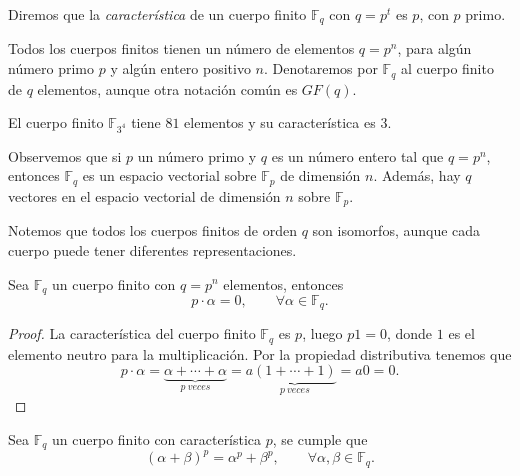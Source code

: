 Diremos que la \emph{característica} de un cuerpo finito $\mathbb{F}_q$ con $q = p^t$ es $p$, con $p$ primo.

Todos los cuerpos finitos tienen un número de elementos $q = p^n$, para algún número primo $p$ y algún entero positivo $n$. Denotaremos por $\mathbb{F}_q$ al cuerpo finito de $q$ elementos, aunque otra notación común es $GF(q)$.

\begin{exampleth}
    El cuerpo finito $\mathbb{F}_{3^4}$ tiene $81$ elementos y su característica es $3$.
\end{exampleth}

Observemos que si $p$ un número primo y $q$ es un número entero tal que $q = p^n$, entonces $\mathbb{F}_q$ es un espacio vectorial sobre $\mathbb{F}_p$ de dimensión $n$. Además, hay $q$ vectores en el espacio vectorial de dimensión $n$ sobre $\mathbb{F}_p$.

Notemos que todos los cuerpos finitos de orden $q$ son isomorfos, aunque cada cuerpo puede tener diferentes representaciones.

\begin{proposition}
    \label{prop:multiplo-p}
    Sea $\mathbb{F}_q$ un cuerpo finito con $q = p^n$ elementos, entonces 
    \[
        p \cdot \alpha = 0, \qquad \forall \alpha \in \mathbb{F}_q.
    \]
\end{proposition}

\begin{proof}
    La característica del cuerpo finito $\mathbb{F}_q$ es $p$, luego $p1 = 0$, donde $1$ es el elemento neutro para la multiplicación. Por la propiedad distributiva tenemos que
    \[
        p \cdot \alpha = \underbrace{\alpha + \cdots + \alpha}_{p\ veces} = a \underbrace{(1 + \cdots + 1)}_{p\ veces} = a0 = 0.
    \]
\end{proof}

\begin{proposition}
    Sea $\mathbb{F}_q$ un cuerpo finito con característica $p$, se cumple que
    \[
        ( \alpha + \beta )^p = \alpha^p + \beta^p, \qquad \forall \alpha, \beta \in \mathbb{F}_q.
    \]
\end{proposition}

